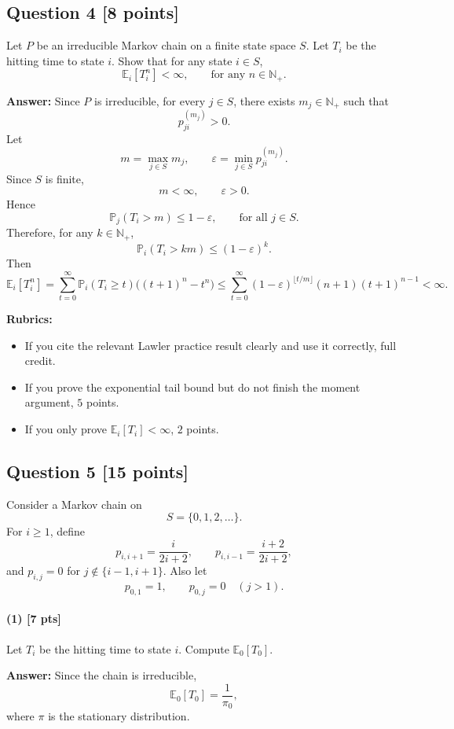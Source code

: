 \documentclass[11pt]{article}
\theoremstyle{definition}
\begin{document}
\subsection*{Question 4 \hfill [8 points]}

Let \(P\) be an irreducible Markov chain on a finite state space \(S\). Let \(T_i\) be the hitting time to state \(i\). Show that for any state \(i\in S\),
\[
\mathbb E_i[T_i^n]<\infty,
\qquad \text{for any } n\in\mathbb N_+.
\]

\textbf{Answer:}
Since \(P\) is irreducible, for every \(j\in S\), there exists \(m_j\in\mathbb N_+\) such that
\[
p_{ji}^{(m_j)}>0.
\]
Let
\[
m=\max_{j\in S} m_j,
\qquad
\varepsilon=\min_{j\in S} p_{ji}^{(m_j)}.
\]
Since \(S\) is finite,
\[
m<\infty,
\qquad
\varepsilon>0.
\]
Hence
\[
\mathbb P_j(T_i>m)\le 1-\varepsilon,
\qquad \text{for all } j\in S.
\]
Therefore, for any \(k\in\mathbb N_+\),
\[
\mathbb P_i(T_i>km)\le (1-\varepsilon)^k.
\]
Then
\[
\mathbb E_i[T_i^n]
=
\sum_{t=0}^\infty \mathbb P_i(T_i\ge t)\big((t+1)^n-t^n\big)
\le
\sum_{t=0}^\infty (1-\varepsilon)^{\lfloor t/m\rfloor}(n+1)(t+1)^{n-1}
<\infty.
\]

\textbf{Rubrics:}
\begin{itemize}[leftmargin=2em]
    \item If you cite the relevant Lawler practice result clearly and use it correctly, full credit.
    \item If you prove the exponential tail bound but do not finish the moment argument, \(5\) points.
    \item If you only prove \(\mathbb E_i[T_i]<\infty\), \(2\) points.
\end{itemize}

\subsection*{Question 5 \hfill [15 points]}

Consider a Markov chain on
\[
S=\{0,1,2,\dots\}.
\]
For \(i\ge 1\), define
\[
p_{i,i+1}=\frac{i}{2i+2},
\qquad
p_{i,i-1}=\frac{i+2}{2i+2},
\]
and \(p_{i,j}=0\) for \(j\notin\{i-1,i+1\}\). Also let
\[
p_{0,1}=1,
\qquad
p_{0,j}=0 \quad (j>1).
\]

\paragraph{(1) \hfill [7 pts]}
Let \(T_i\) be the hitting time to state \(i\). Compute \(\mathbb E_0[T_0]\).

\textbf{Answer:}
Since the chain is irreducible,
\[
\mathbb E_0[T_0]=\frac{1}{\pi_0},
\]
where \(\pi\) is the stationary distribution.
\end{document}
